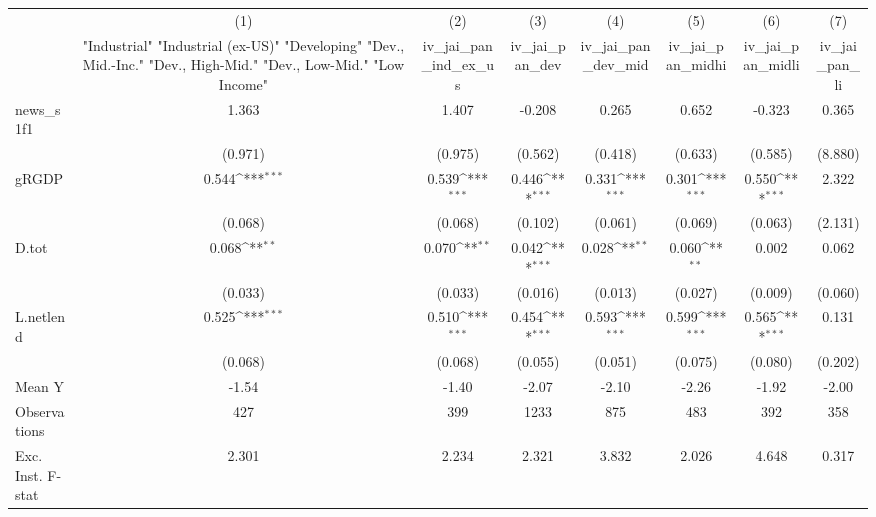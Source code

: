 {
\def\sym#1{\ifmmode^{#1}\else\(^{#1}\)\fi}
\begin{tabular}{l*{7}{c}}
\toprule
            &\multicolumn{1}{c}{(1)}&\multicolumn{1}{c}{(2)}&\multicolumn{1}{c}{(3)}&\multicolumn{1}{c}{(4)}&\multicolumn{1}{c}{(5)}&\multicolumn{1}{c}{(6)}&\multicolumn{1}{c}{(7)}\\
            &\multicolumn{1}{c}{ "Industrial" "Industrial (ex-US)" "Developing" "Dev., Mid.-Inc." "Dev., High-Mid."  "Dev., Low-Mid." "Low Income" }&\multicolumn{1}{c}{iv\_jai\_pan\_ind\_ex\_us}&\multicolumn{1}{c}{iv\_jai\_pan\_dev}&\multicolumn{1}{c}{iv\_jai\_pan\_dev\_mid}&\multicolumn{1}{c}{iv\_jai\_pan\_midhi}&\multicolumn{1}{c}{iv\_jai\_pan\_midli}&\multicolumn{1}{c}{iv\_jai\_pan\_li}\\
\midrule
news\_s1f1   &       1.363         &       1.407         &      -0.208         &       0.265         &       0.652         &      -0.323         &       0.365         \\
            &     (0.971)         &     (0.975)         &     (0.562)         &     (0.418)         &     (0.633)         &     (0.585)         &     (8.880)         \\
\addlinespace
gRGDP       &       0.544\sym{***}&       0.539\sym{***}&       0.446\sym{***}&       0.331\sym{***}&       0.301\sym{***}&       0.550\sym{***}&       2.322         \\
            &     (0.068)         &     (0.068)         &     (0.102)         &     (0.061)         &     (0.069)         &     (0.063)         &     (2.131)         \\
\addlinespace
D.tot       &       0.068\sym{**} &       0.070\sym{**} &       0.042\sym{***}&       0.028\sym{**} &       0.060\sym{**} &       0.002         &       0.062         \\
            &     (0.033)         &     (0.033)         &     (0.016)         &     (0.013)         &     (0.027)         &     (0.009)         &     (0.060)         \\
\addlinespace
L.netlend   &       0.525\sym{***}&       0.510\sym{***}&       0.454\sym{***}&       0.593\sym{***}&       0.599\sym{***}&       0.565\sym{***}&       0.131         \\
            &     (0.068)         &     (0.068)         &     (0.055)         &     (0.051)         &     (0.075)         &     (0.080)         &     (0.202)         \\
\midrule
Mean Y      &       -1.54         &       -1.40         &       -2.07         &       -2.10         &       -2.26         &       -1.92         &       -2.00         \\
Observations&         427         &         399         &        1233         &         875         &         483         &         392         &         358         \\
Exc. Inst. F-stat&       2.301         &       2.234         &       2.321         &       3.832         &       2.026         &       4.648         &       0.317         \\
\bottomrule
\end{tabular}
}
